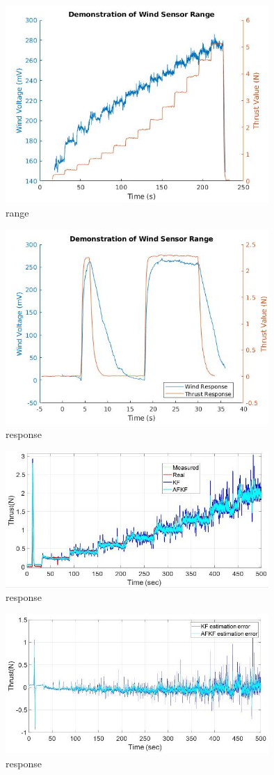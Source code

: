 \documentclass[conference]{IEEEtran}
\begin{document}
	\begin{figure}[htbp]
	\includegraphics[width=10cm]{images/figure_1/range.jpg}
	\caption{range}
	\label{range}
\end{figure}
	\begin{figure}[htbp]
	\includegraphics[width=10cm]{images/figure_1/response.jpg}
	\caption{response}
	\label{response}
\end{figure}
\begin{figure}[htbp]
\includegraphics[width=10cm]{images/akf1.jpg}
\caption{response}
\label{akf1}
\end{figure}
\begin{figure}[htbp]
\includegraphics[width=10cm]{images/akf2.jpg}
\caption{response}
\label{akf2}
\end{figure}
\end{document}

